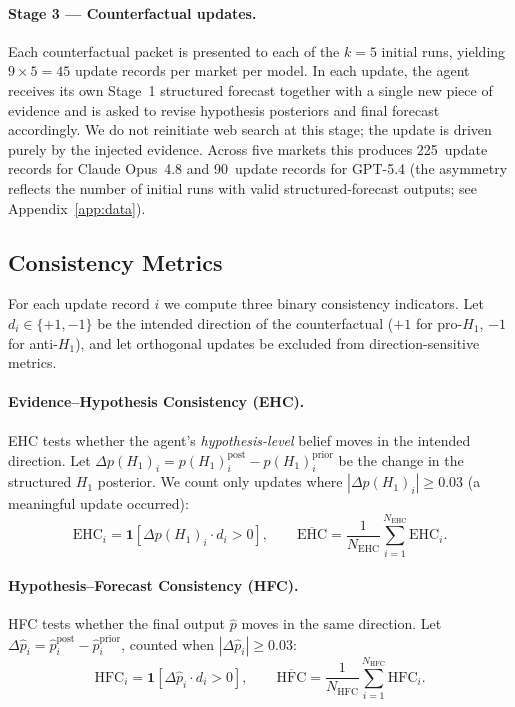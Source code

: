 \paragraph{Stage 3 --- Counterfactual updates.}
Each counterfactual packet is presented to each of the $k = 5$ initial runs, yielding $9 \times 5 = 45$
update records per market per model.  In each update, the agent receives its own Stage~1 structured
forecast together with a single new piece of evidence and is asked to revise hypothesis posteriors and
final forecast accordingly.  We do not reinitiate web search at this stage; the update is driven
purely by the injected evidence.  Across five markets this produces 225~update records for Claude
Opus~4.8 and 90~update records for GPT-5.4 (the asymmetry reflects the number of initial runs with
valid structured-forecast outputs; see Appendix~\ref{app:data}).

\subsection{Consistency Metrics}
\label{sec:metrics}

For each update record $i$ we compute three binary consistency indicators.  Let $d_i \in
\{+1,-1\}$ be the intended direction of the counterfactual ($+1$ for pro-$H_1$, $-1$ for
anti-$H_1$), and let orthogonal updates be excluded from direction-sensitive metrics.

\paragraph{Evidence--Hypothesis Consistency (EHC).}
EHC tests whether the agent's \emph{hypothesis-level} belief moves in the intended direction.
Let $\Delta p(H_1)_i = p(H_1)_i^{\text{post}} - p(H_1)_i^{\text{prior}}$ be the change in the
structured $H_1$ posterior.  We count only updates where $|\Delta p(H_1)_i| \geq 0.03$
(a meaningful update occurred):
\begin{equation}
    \text{EHC}_i = \mathbf{1}\!\left[\Delta p(H_1)_i \cdot d_i > 0\right],
    \qquad
    \overline{\text{EHC}} = \frac{1}{N_\text{EHC}}\sum_{i=1}^{N_\text{EHC}} \text{EHC}_i.
    \label{eq:ehc}
\end{equation}

\paragraph{Hypothesis--Forecast Consistency (HFC).}
HFC tests whether the final output $\hat{p}$ moves in the same direction.  Let $\Delta\hat{p}_i =
\hat{p}_i^{\text{post}} - \hat{p}_i^{\text{prior}}$, counted when $|\Delta\hat{p}_i| \geq 0.03$:
\begin{equation}
    \text{HFC}_i = \mathbf{1}\!\left[\Delta\hat{p}_i \cdot d_i > 0\right],
    \qquad
    \overline{\text{HFC}} = \frac{1}{N_\text{HFC}}\sum_{i=1}^{N_\text{HFC}} \text{HFC}_i.
    \label{eq:hfc}
\end{equation}

